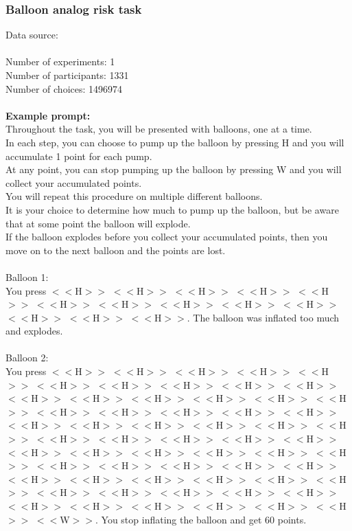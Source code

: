 \documentclass[pdflatex,sn-nature]{sn-jnl}%
\theoremstyle{thmstyleone}%
\theoremstyle{thmstyletwo}%
\theoremstyle{thmstylethree}%
\begin{document}
\subsubsection*{Balloon analog risk task}
Data source: \cite{frey2017risk} \\ $~$ \\
Number of experiments: 1 $~$\\ 
Number of participants: 1331 $~$\\ 
Number of choices: 1496974 $~$\\ 
 $~$\\ 
\textbf{Example prompt:}
 $~$\\ 
Throughout the task, you will be presented with balloons, one at a time. $~$\\ 
In each step, you can choose to pump up the balloon by pressing H and you will accumulate 1 point for each pump. $~$\\ 
At any point, you can stop pumping up the balloon by pressing W and you will collect your accumulated points. $~$\\ 
You will repeat this procedure on multiple different balloons. $~$\\ 
It is your choice to determine how much to pump up the balloon, but be aware that at some point the balloon will explode. $~$\\ 
If the balloon explodes before you collect your accumulated points, then you move on to the next balloon and the points are lost. $~$\\ 
 $~$\\ 
Balloon 1: $~$\\ 
You press $<<$H$>>$ $<<$H$>>$ $<<$H$>>$ $<<$H$>>$ $<<$H$>>$ $<<$H$>>$ $<<$H$>>$ $<<$H$>>$ $<<$H$>>$ $<<$H$>>$ $<<$H$>>$ $<<$H$>>$ $<<$H$>>$. The balloon was inflated too much and explodes. $~$\\ 
 $~$\\ 
Balloon 2: $~$\\ 
You press $<<$H$>>$ $<<$H$>>$ $<<$H$>>$ $<<$H$>>$ $<<$H$>>$ $<<$H$>>$ $<<$H$>>$ $<<$H$>>$ $<<$H$>>$ $<<$H$>>$ $<<$H$>>$ $<<$H$>>$ $<<$H$>>$ $<<$H$>>$ $<<$H$>>$ $<<$H$>>$ $<<$H$>>$ $<<$H$>>$ $<<$H$>>$ $<<$H$>>$ $<<$H$>>$ $<<$H$>>$ $<<$H$>>$ $<<$H$>>$ $<<$H$>>$ $<<$H$>>$ $<<$H$>>$ $<<$H$>>$ $<<$H$>>$ $<<$H$>>$ $<<$H$>>$ $<<$H$>>$ $<<$H$>>$ $<<$H$>>$ $<<$H$>>$ $<<$H$>>$ $<<$H$>>$ $<<$H$>>$ $<<$H$>>$ $<<$H$>>$ $<<$H$>>$ $<<$H$>>$ $<<$H$>>$ $<<$H$>>$ $<<$H$>>$ $<<$H$>>$ $<<$H$>>$ $<<$H$>>$ $<<$H$>>$ $<<$H$>>$ $<<$H$>>$ $<<$H$>>$ $<<$H$>>$ $<<$H$>>$ $<<$H$>>$ $<<$H$>>$ $<<$H$>>$ $<<$H$>>$ $<<$H$>>$ $<<$H$>>$ $<<$W$>>$. You stop inflating the balloon and get 60 points. $~$\\ 
\end{document}

